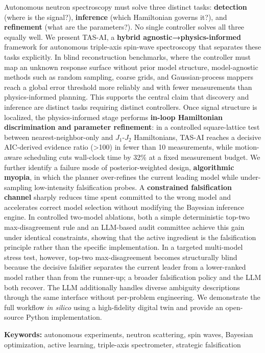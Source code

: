 \documentclass[
]{article}
\begin{document}
Autonomous neutron spectroscopy must solve three distinct tasks:
\textbf{detection} (where is the signal?), \textbf{inference} (which
Hamiltonian governs it?), and \textbf{refinement} (what are the
parameters?). No single controller solves all three equally well. We
present TAS-AI, a \textbf{hybrid agnostic→physics-informed} framework
for autonomous triple-axis spin-wave spectroscopy that separates these
tasks explicitly. In blind reconstruction benchmarks, where the
controller must map an unknown response surface without prior model
structure, model-agnostic methods such as random sampling, coarse grids,
and Gaussian-process mappers reach a global error threshold more
reliably and with fewer measurements than physics-informed planning.
This supports the central claim that discovery and inference are
distinct tasks requiring distinct controllers. Once signal structure is
localized, the physics-informed stage performs \textbf{in-loop
Hamiltonian discrimination and parameter refinement}: in a controlled
square-lattice test between nearest-neighbor-only and \(J_1\)-\(J_2\)
Hamiltonians, TAS-AI reaches a decisive AIC-derived evidence ratio
(\textgreater100) in fewer than 10 measurements, while motion-aware
scheduling cuts wall-clock time by 32\% at a fixed measurement budget.
We further identify a failure mode of posterior-weighted design,
\textbf{algorithmic myopia}, in which the planner over-refines the
current leading model while under-sampling low-intensity falsification
probes. A \textbf{constrained falsification channel} sharply reduces
time spent committed to the wrong model and accelerates correct model
selection without modifying the Bayesian inference engine. In controlled
two-model ablations, both a simple deterministic top-two
max-disagreement rule and an LLM-based audit committee achieve this gain
under identical constraints, showing that the active ingredient is the
falsification principle rather than the specific implementation. In a
targeted multi-model stress test, however, top-two max-disagreement
becomes structurally blind because the decisive falsifier separates the
current leader from a lower-ranked model rather than from the runner-up;
a broader falsification policy and the LLM both recover. The LLM
additionally handles diverse ambiguity descriptions through the same
interface without per-problem engineering. We demonstrate the full
workflow \emph{in silico} using a high-fidelity digital twin and provide
an open-source Python implementation.

\textbf{Keywords:} autonomous experiments, neutron scattering, spin
waves, Bayesian optimization, active learning, triple-axis spectrometer,
strategic falsification
\end{document}
